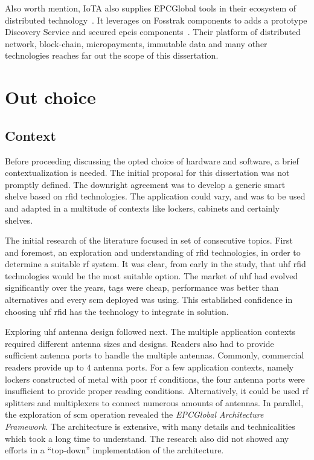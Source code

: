Also worth mention, IoTA also supplies EPCGlobal tools in their ecosystem of distributed technology~\cite{GlobalTradeSupply}. It leverages on Fosstrak components to adds a prototype Discovery Service and secured \ac{epcis} components~\cite{FosstrakSimilarProjects}. Their platform of distributed network, block-chain, micropayments, immutable data and many other technologies reaches far out the scope of this dissertation.

\section{Out choice} \label{sec:ourchoice}

\subsection{Context}

Before proceeding discussing the opted choice of hardware and software, a brief contextualization is needed.
The initial proposal for this dissertation was not promptly defined. The downright agreement was to develop a generic smart shelve based on \ac{rfid} technologies. The application could vary, and was to be used and adapted in a multitude of contexts like lockers, cabinets and certainly shelves.

The initial research of the literature focused in set of consecutive topics.
First and foremost, an exploration and understanding of \ac{rfid} technologies, in order to determine a suitable \ac{rf} system. It was clear, from early in the study, that \ac{uhf} \ac{rfid} technologies would be the most suitable option. The market of \ac{uhf} had evolved significantly over the years, tags were cheap, performance was better than alternatives and every \ac{scm} deployed was using. This established confidence in choosing \ac{uhf} \ac{rfid} has the technology to integrate in solution.

Exploring \ac{uhf} antenna design followed next. The multiple application contexts required different antenna sizes and designs.
Readers also had to provide sufficient antenna ports to handle the multiple antennas. Commonly, commercial readers provide up to $4$ antenna ports. For a few application contexts, namely lockers constructed of metal with poor \ac{rf} conditions, the four antenna ports were insufficient to provide proper reading conditions. Alternatively, it could be used \ac{rf} splitters and multiplexers to connect numerous amounts of antennas.
In parallel, the exploration of \ac{scm} operation revealed the \emph{EPCGlobal Architecture Framework}. The architecture is extensive, with many details and technicalities which took a long time to understand. The research also did not showed any efforts in a ``top-down'' implementation of the architecture.


